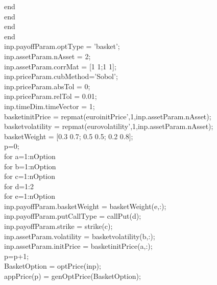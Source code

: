 \documentclass[]{elsarticle}
\theoremstyle{definition}
\theoremstyle{remark}
\begin{document}
                          end\\
                      end\\
                  end\\
              end\\
              inp.payoffParam.optType = {'basket'};\\
              inp.assetParam.nAsset = 2;\\
              inp.assetParam.corrMat = [1 1;1 1];\\
              inp.priceParam.cubMethod='Sobol';\\
              inp.priceParam.absTol = 0;   \\
              inp.priceParam.relTol = 0.01;\\
              inp.timeDim.timeVector = 1;\\
              basketinitPrice = repmat(euroinitPrice',1,inp.assetParam.nAsset);\\
              basketvolatility = repmat(eurovolatility',1,inp.assetParam.nAsset);\\
              basketWeight = [0.3 0.7; 0.5 0.5; 0.2 0.8];\\
              p=0;\\
              for a=1:nOption\\
                  for b=1:nOption\\
                      for c=1:nOption\\
                          for d=1:2\\
                              for e=1:nOption\\
                                 inp.payoffParam.basketWeight = basketWeight(e,:);\\
                                 inp.payoffParam.putCallType = callPut(d);\\
                                 inp.payoffParam.strike = strike(c);\\
                                 inp.assetParam.volatility = basketvolatility(b,:);\\
                                 inp.assetParam.initPrice = basketinitPrice(a,:);\\
                                 p=p+1;\\
                                 BasketOption = optPrice(inp);\\
                                 appPrice(p) = genOptPrice(BasketOption);\\
\end{document}
